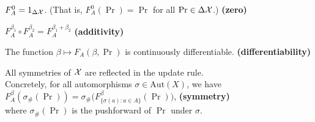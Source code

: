 \documentclass{article}
\begin{document}
%
%
%
\begin{URaxioms}
    \item  $F^{0}_A  = {1}_{\Delta\mathcal X}$. (That is, $F^{0}_A(\Pr) = \Pr$ for all $\Pr \in \Delta\mathcal X$.)
        \hfill \textbf{(zero)} \label{ax:zero}
    \item $F^{\beta_1}_A \circ F^{\beta_2}_A = F^{\beta_1 + \beta_2}_A$
        \hfill \textbf{(additivity)} \label{ax:additivity}
        
    \item The function $\beta\mapsto F_A(\beta, \Pr)$ is continuously differentiable.
            \hfill \textbf{(differentiability)} \label{ax:diffble}
    
    \item All symmetries of $\mathcal X$ are reflected in the update rule. \\
        Concretely, for all automorphisms $\sigma
            \in \mathrm{Aut}(X)$, we have \\
        \indent\hspace{2em}$F^\beta_A(\sigma_\#(\Pr)) = \sigma_\#\Big(F^\beta_{\{\sigma(a) : a \in A \}}(\Pr)\Big)$,
            \hfill \textbf{(symmetry)} \label{ax:symmetry}
        \\
        where $\sigma_\#(\Pr)$ is the pushforward of $\Pr$ under $\sigma$.
    
\end{URaxioms}
\end{document}

